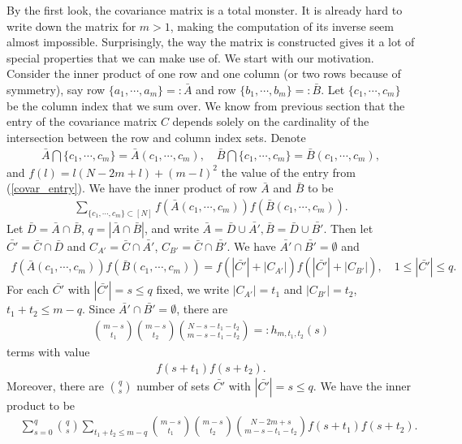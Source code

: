 \documentclass[10pt]{article}
\newenvironment{Proof of lemma}{\noindent{\bf Proof of Lemma}}{\hfill$\Box$\newline}
\newenvironment{Proof of claim}{\noindent{\bf Proof of claim}}{\hfill$\Box$\newline}
\newenvironment{Proof of theorem}{\noindent{\bf Proof of Theorem}}{\hfill\scriptsize{$\Box$}\newline}
\newenvironment{Proof of theorems}{\noindent{\bf Proof of Theorems}}{\hfill$\Box$\newline}
\newenvironment{Proof of proposition}{\noindent{\bf Proof of Proposition}}{\hfill$\Box$\newline}
\newenvironment{Proof of propositions}{\noindent{\bf Proof of Propositions}}{\hfill$\Box$\newline}
\newenvironment{Proof of exercise}{\noindent{\it Proof of Exercise:}}{\hfill$\Box$}
\numberwithin{equation}{section}
\begin{document}
By the first look, the covariance matrix is a total monster. It is already hard to write down the matrix for $m>1$, making the computation of its inverse seem almost impossible. Surprisingly, the way the matrix is constructed gives it a lot of special properties that we can make use of. We start with our motivation. Consider the inner product of one row and one column (or two rows because of symmetry), say row $\{a_1,\cdots, a_m\}=:\bar{A}$ and row $\{b_1,\cdots, b_m\}=:\bar{B}$. Let $\{c_1,\cdots, c_m\}$ be the column index that we sum over. We know from previous section that the entry of the covariance matrix $C$ depends solely on the cardinality of the intersection between the row and column index sets. Denote
\begin{align}
    \bar{A} \bigcap \{c_1,\cdots, c_m\} = \bar{A}(c_1,\cdots,c_m),\quad \bar{B} \bigcap \{c_1,\cdots, c_m\} = \bar{B}(c_1,\cdots,c_m),
\end{align}
and $f(l)= l(N-2m+l)+(m-l)^2$ the value of the entry from (\ref{covar_entry}). We have the inner product of row $\bar{A}$ and $\bar{B}$ to be
\begin{align}
    \sum_{\{c_1,\cdots, c_m\} \subset [N]}f(\bar{A}(c_1,\cdots,c_m))f(\bar{B}(c_1,\cdots,c_m)).
\end{align}
Let $\bar{D} = \bar{A} \cap \bar{B}$, $q = |\bar{A} \cap \bar{B}|$, and write $\bar{A} = \bar{D} \cup \bar{A'}, \bar{B} = \bar{D} \cup \bar{B'}$. Then let $\bar{C'} = \bar{C} \cap \bar{D}$ and $C_{A'} = \bar{C} \cap \bar{A'}$, $C_{B'} = \bar{C} \cap \bar{B'}$. We have $\bar{A'} \cap \bar{B'} =\emptyset$ and
\begin{align}
    f(\bar{A}(c_1,\cdots,c_m))f(\bar{B}(c_1,\cdots,c_m)) = f(|\bar{C'}|+|C_{A'}|)f(|\bar{C'}|+|C_{B'}|), \quad 1 \leq |\bar{C'}| \leq q.
\end{align}
For each $\bar{C'}$ with $|\bar{C'}|=s \leq q$ fixed, we write $|C_{A'}| = t_1$ and $|C_{B'}| = t_2$, $t_1+t_2 \leq m-q$. Since $\bar{A'} \cap \bar{B'} =\emptyset$, there are
\begin{align} \label{inverse_formula_1}
    \binom{m-s}{t_1}\binom{m-s}{t_2}\binom{N-s-t_1-t_2}{m-s-t_1-t_2} =: h_{m,t_1,t_2}(s)
\end{align}
terms with value
\begin{align}
    f(s+t_1)f(s+t_2).
\end{align}
Moreover, there are $\binom{q}{s}$ number of sets $\bar{C'}$ with $|\bar{C'}|=s \leq q$. We have the inner product to be
\begin{align} \label{inverse_formula_2}
    &\sum_{s = 0}^q \binom{q}{s} \sum_{t_1+t_2 \leq m-q}\binom{m-s}{t_1}\binom{m-s}{t_2}\binom{N-2m+s}{m-s-t_1-t_2}f(s+t_1)f(s+t_2).
\end{align}
\end{document}
